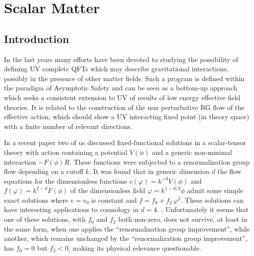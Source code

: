 \documentclass[11pt]{book} %
\begin{document}

\chapter{Scalar Matter}

\section{Introduction}

In the last years many efforts have been devoted to studying the possibility of defining UV complete QFTs
which may describe gravitational interactions,
possibly in the presence of other matter fields.
Such a program is defined within the paradigm of Asymptotic Safety \cite{Weinberg:1980gg}
and can be seen as a bottom-up approach which seeks a consistent extension
to UV of results of low energy effective field theories.
It is related to the construction of the non perturbative RG flow of the effective action,
which should show a UV interacting fixed point (in theory space)
with a finite number of relevant directions.

In a recent paper \cite{Percacci:2015wwa} two of us discussed
fixed-functional solutions
in a scalar-tensor theory with action containing a potential $V(\phi)$
and a generic non-minimal interaction $-F(\phi)R$.
These functions were subjected to a renormalization group flow
depending on a cutoff $k$.
It was found that in generic dimension $d$ the flow equations for the dimensionless
functions $v(\varphi)=k^{-d}V(\phi)$ and $f(\varphi)=k^{2-d}F(\phi)$
of the dimensionless field $\varphi=k^{1-d/2}\phi$
admit some simple exact solutions where $v=v_0$ is constant and
$f=f_0 + f_2 \, \varphi^2$.
These solutions can have interesting applications to cosmology in $d=4$.
\cite{Henz:2013oxa}.
Unfortunately it seems that one of these solutions,
with $f_0$ and $f_2$ both non-zero, does not survive,
at least in the same form, when one applies the
``renormalization group improvement'',
while another, which remains unchanged by the
``renormalization group improvement'',
has $f_0=0$ but $f_2<0$, making its physical relevance questionable.
\end{document}

